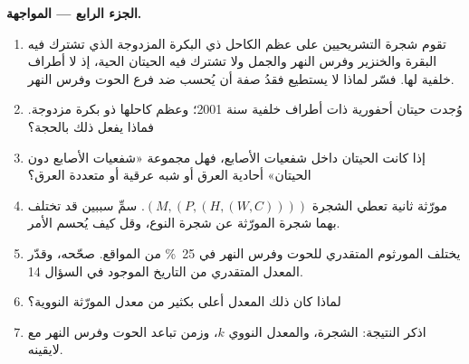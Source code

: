 \begin{problem}
\medskip
\noindent\textbf{الجزء الرابع --- المواجهة.}
\begin{enumerate}[resume]
  \item تقوم شجرة التشريحيين على عظم الكاحل ذي البكرة
        المزدوجة الذي تشترك فيه البقرة والخنزير وفرس النهر والجمل ولا تشترك فيه
        الحيتان الحية، إذ لا أطراف خلفية لها. فسّر لماذا لا يستطيع
        فقدُ صفة أن يُحسب ضد فرع الحوت وفرس النهر.
  \item وُجدت حيتان أحفورية ذات أطراف خلفية سنة 2001؛ وعظم
        كاحلها ذو بكرة مزدوجة. فماذا يفعل ذلك بالحجة؟
  \item إذا كانت الحيتان داخل شفعيات الأصابع، فهل مجموعة
        «شفعيات الأصابع دون الحيتان» أحادية العرق أو
        شبه عرقية أو متعددة العرق؟
  \item مورّثة ثانية تعطي الشجرة $(M,(P,(H,(W,C))))$. سمِّ سببين
        قد تختلف بهما شجرة المورّثة عن شجرة النوع، وقل
        كيف يُحسم الأمر.
  \item يختلف المورثوم المتقدري للحوت وفرس النهر في
        \qty{25}{\%} من المواقع. صحّحه، وقدّر المعدل
        المتقدري من التاريخ الموجود في السؤال 14.
  \item لماذا كان ذلك المعدل أعلى بكثير من معدل المورّثة النووية؟
  \item اذكر النتيجة: الشجرة، والمعدل النووي $k$، وزمن
        تباعد الحوت وفرس النهر مع لايقينه.
\end{enumerate}
\end{problem}

